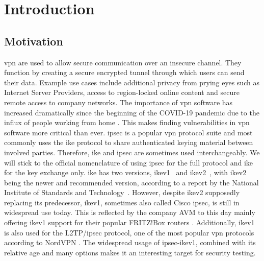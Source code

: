 %
%
% 

\chapter{Introduction}

\label{chap:Introduction}

\section{Motivation}
\ac{vpn} are used to allow secure communication over an insecure channel. They function by creating a secure encrypted tunnel through which users can send their data. Example use cases include additional privacy from prying eyes such as Internet Server Providers, access to region-locked online content and secure remote access to company networks. The importance of \ac{vpn} software has increased dramatically since the beginning of the COVID-19 pandemic due to the influx of people working from home \cite{DBLP:journals/cacm/FeldmannGLPPDWW21}. This makes finding vulnerabilities in \ac{vpn} software more critical than ever. %
\ac{ipsec} is a popular \ac{vpn} protocol suite and most commonly uses the \ac{ike} protocol to share authenticated keying material between involved parties. Therefore, \ac{ike} and \ac{ipsec} are sometimes used interchangeably. We will stick to the official nomenclature of using \ac{ipsec} for the full protocol and \ac{ike} for the key exchange only. \ac{ike} has two versions, \ac{ike}v1~\cite{rfc:ikev1} and \ac{ike}v2~\cite{rfc:ikev2}, with \ac{ike}v2 being the newer and recommended version, according to a report by the National Institute of Standards and Technology~\cite{nist791491}. However, despite \ac{ike}v2 supposedly replacing its predecessor, \ac{ike}v1, sometimes also called Cisco \ac{ipsec}, is still in widespread use today. This is reflected by the company AVM to this day mainly offering \ac{ike}v1 support for their popular FRITZ!Box routers \cite{avm2022}. Additionally, \ac{ike}v1 is also used for the L2TP/\ac{ipsec} protocol, one of the most popular \ac{vpn} protocols according to NordVPN \cite{nordvpn2021}. The widespread usage of \ac{ipsec}-\ac{ike}v1, combined with its relative age and many options makes it an interesting target for security testing.


